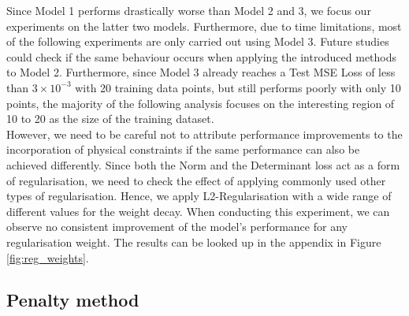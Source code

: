 \indent Since Model 1 performs drastically worse than Model 2 and 3, we focus our experiments on the latter two models. Furthermore, due to time limitations, most of the following experiments are only carried out using Model 3. Future studies could check if the same behaviour occurs when applying the introduced methods to Model 2. Furthermore, since Model 3 already reaches a Test MSE Loss of less than $3\times10^{-3}$ with 20 training data points, but still performs poorly with only 10 points, the majority of the following analysis focuses on the interesting region of 10 to 20 as the size of the training dataset. \\
\indent However, we need to be careful not to attribute performance improvements to the incorporation of physical constraints if the same performance can also be achieved differently. Since both the Norm and the Determinant loss act as a form of regularisation, we need to check the effect of applying commonly used other types of regularisation. Hence, we apply L2-Regularisation with a wide range of different values for the weight decay. When conducting this experiment, we can observe no consistent improvement of the model's performance for any regularisation weight. The results can be looked up in the appendix in Figure \ref{fig:reg_weights}.

\subsection{Penalty method}
